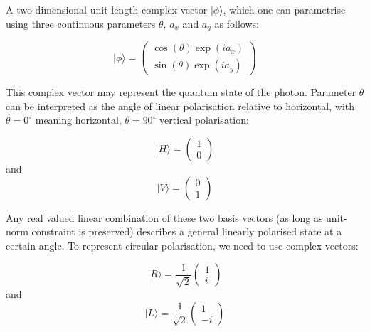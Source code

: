 A two-dimensional unit-length complex vector $\vert \phi \rangle$, which one can parametrise using three continuous parameters $\theta$, $a_x$ and $a_y$ as follows:

\begin{equation}
	\vert \phi \rangle = \left(\begin{array}{c}
		\cos(\theta)\exp(ia_x)\\
		\sin(\theta)\exp(ia_y)\end{array}\right)
\end{equation}

This complex vector may represent the quantum state of the photon. Parameter $\theta$ can be interpreted as the angle of linear polarisation relative to horizontal, with $\theta = 0^{\circ}$ meaning horizontal, $\theta=90^{\circ}$ vertical polarisation:

\begin{equation}
	\vert H \rangle = \left(\begin{array}{c}
		1\\
		0\end{array}\right)
	\label{eqn:photon_horizontal}
\end{equation}
and
\begin{equation}
	\vert V \rangle = \left(\begin{array}{c}
		0\\
		1\end{array}\right)
	\label{eqn:photon_vertical}
\end{equation}

Any real valued linear combination of these two basis vectors (as long as unit-norm constraint is preserved) describes a general linearly polarised state at a certain angle. To represent circular polarisation, we need to use complex vectors:

\begin{equation}
	\vert R \rangle = \frac{1}{\sqrt{2}}\left(\begin{array}{c}
		1\\
		i\end{array}\right)
	\label{eqn:photon_right}
\end{equation}
and
\begin{equation}
	\vert L \rangle = \frac{1}{\sqrt{2}}\left(\begin{array}{c}
		1\\
		-i\end{array}\right)
	\label{eqn:photon_left}
\end{equation}

